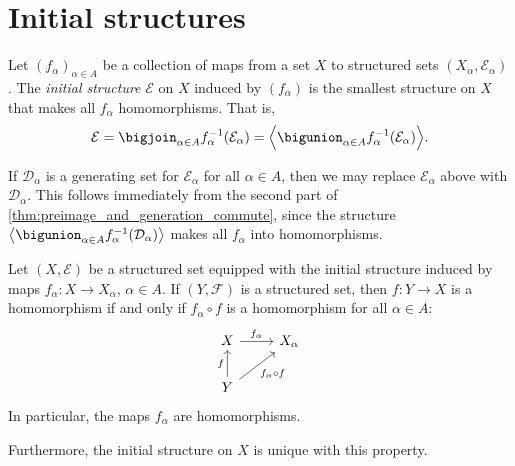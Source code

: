 \documentclass[article, a4paper, 11pt, oneside]{memoir}
\numberwithin{equation}{chapter}
\newcommand{\calE}{\mathcal{E}}
\newcommand{\calD}{\mathcal{D}}
\newcommand{\calF}{\mathcal{F}}
\DeclarePairedDelimiter{\gen}{\langle}{\rangle} %
\begin{document}
\section{Initial structures}

\begin{definition}
    Let $(f_\alpha)_{\alpha \in A}$ be a collection of maps from a set $X$ to structured sets $(X_\alpha, \calE_\alpha)$. The \emph{initial structure} $\calE$ on $X$ induced by $(f_\alpha)$ is the smallest structure on $X$ that makes all $f_\alpha$ homomorphisms. That is,
    \begin{equation*}
        \calE
            = \bigjoin_{\alpha \in A} f_\alpha^{-1}(\calE_\alpha)
            = \gen[\Big]{ \bigunion_{\alpha \in A} f_\alpha^{-1}(\calE_\alpha) }.
    \end{equation*}
\end{definition}

\begin{remark}
    \label{rem:initial_structure_generating_set}
    If $\calD_\alpha$ is a generating set for $\calE_\alpha$ for all $\alpha \in A$, then we may replace $\calE_\alpha$ above with $\calD_\alpha$. This follows immediately from the second part of \cref{thm:preimage_and_generation_commute}, since the structure $\gen[\big]{ \bigunion_{\alpha \in A} f_\alpha^{-1}(\calD_\alpha) }$ makes all $f_\alpha$ into homomorphisms.
\end{remark}


\begin{theorem}
    Let $(X,\calE)$ be a structured set equipped with the initial structure induced by maps $f_\alpha \colon X \to X_\alpha$,  $\alpha \in A$. If $(Y,\calF)$ is a structured set, then $f \colon Y \to X$ is a homomorphism if and only if $f_\alpha \circ f$ is a homomorphism for all $\alpha \in A$:
    \begin{equation*}
        \begin{tikzcd}
            X
                \ar[r, "f_\alpha"]
            & X_\alpha \\
            Y
                \ar[u, "f"]
                \ar[ur, "f_\alpha \circ f", swap]
        \end{tikzcd}
    \end{equation*}
    In particular, the maps $f_\alpha$ are homomorphisms.

    Furthermore, the initial structure on $X$ is unique with this property.
\end{theorem}
\end{document}
